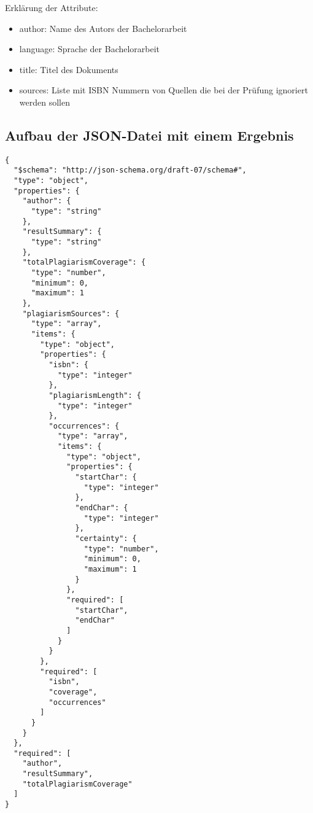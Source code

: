 Erklärung der Attribute:
\begin{itemize}
    \item author: Name des Autors der Bachelorarbeit
    \item language: Sprache der Bachelorarbeit
    \item title: Titel des Dokuments
    \item sources: Liste mit ISBN Nummern von Quellen die bei der Prüfung ignoriert werden sollen
\end{itemize}

\subsection{Aufbau der JSON-Datei mit einem Ergebnis}\label{subsec:json-ergebnis}
\begin{lstlisting}[caption={JSON-Datei mit einem Ergebnis},captionpos=b,label={lst:json-ergebnis}]
{
  "$schema": "http://json-schema.org/draft-07/schema#",
  "type": "object",
  "properties": {
    "author": {
      "type": "string"
    },
    "resultSummary": {
      "type": "string"
    },
    "totalPlagiarismCoverage": {
      "type": "number",
      "minimum": 0,
      "maximum": 1
    },
    "plagiarismSources": {
      "type": "array",
      "items": {
        "type": "object",
        "properties": {
          "isbn": {
            "type": "integer"
          },
          "plagiarismLength": {
            "type": "integer"
          },
          "occurrences": {
            "type": "array",
            "items": {
              "type": "object",
              "properties": {
                "startChar": {
                  "type": "integer"
                },
                "endChar": {
                  "type": "integer"
                },
                "certainty": {
                  "type": "number",
                  "minimum": 0,
                  "maximum": 1
                }
              },
              "required": [
                "startChar",
                "endChar"
              ]
            }
          }
        },
        "required": [
          "isbn",
          "coverage",
          "occurrences"
        ]
      }
    }
  },
  "required": [
    "author",
    "resultSummary",
    "totalPlagiarismCoverage"
  ]
}
\end{lstlisting}


